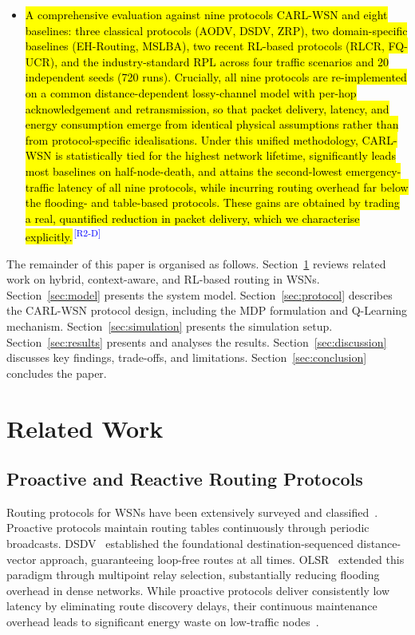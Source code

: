 \documentclass[12pt]{article}
\newcommand{\rtag}[1]{\textsuperscript{\textcolor{blue}{\scriptsize\,[#1]}}}
\newcommand{\hlx}[1]{{\exhyphenpenalty=10000\hyphenpenalty=10000\let\ \nobreakspace\hl{#1}}}
\begin{document}
\begin{itemize}
\item \hlx{A comprehensive evaluation against nine protocols \textemdash{} CARL-WSN and eight baselines: three classical protocols (AODV,
DSDV, ZRP), two domain-specific baselines (EH-Routing, MSLBA), two
recent RL-based protocols (RLCR, FQ-UCR), and the industry-standard
RPL \textemdash{} across four traffic scenarios and 20 independent seeds (720
runs). Crucially, all nine protocols are re-implemented on a common
distance-dependent lossy-channel model with per-hop acknowledgement and retransmission, so that packet delivery, latency, and energy consumption emerge from identical
physical assumptions rather than from protocol-specific idealisations. Under this unified methodology,
CARL-WSN is statistically tied for the highest network lifetime, significantly leads
most baselines on half-node-death, and attains the second-lowest emergency-traffic
latency of all nine protocols, while incurring routing overhead far below the
flooding- and table-based protocols. These gains are obtained by trading a real,
quantified reduction in packet delivery, which we characterise explicitly.}\rtag{R2-D}
\end{itemize}

The remainder of this paper is organised as follows.
Section~\ref{sec:related} reviews related work on hybrid, context-aware,
and RL-based routing in WSNs. Section~\ref{sec:model} presents the
system model. Section~\ref{sec:protocol} describes the CARL-WSN
protocol design, including the MDP formulation and Q-Learning
mechanism. Section~\ref{sec:simulation} presents the simulation setup.
Section~\ref{sec:results} presents and analyses the results.
Section~\ref{sec:discussion} discusses key findings, trade-offs, and
limitations. Section~\ref{sec:conclusion} concludes the paper.


\section{Related Work}
\label{sec:related}

\subsection{Proactive and Reactive Routing Protocols}

Routing protocols for WSNs have been extensively surveyed and
classified~\cite{akkaya2005}. Proactive protocols maintain routing
tables continuously through periodic broadcasts. DSDV~\cite{perkins1994}
established the foundational destination-sequenced distance-vector
approach, guaranteeing loop-free routes at all times.
OLSR~\cite{clausen2003} extended this paradigm through multipoint relay
selection, substantially reducing flooding overhead in dense networks.
While proactive protocols deliver consistently low latency by
eliminating route discovery delays, their continuous maintenance
overhead leads to significant energy waste on low-traffic
nodes~\cite{akkaya2005}.
\end{document}

